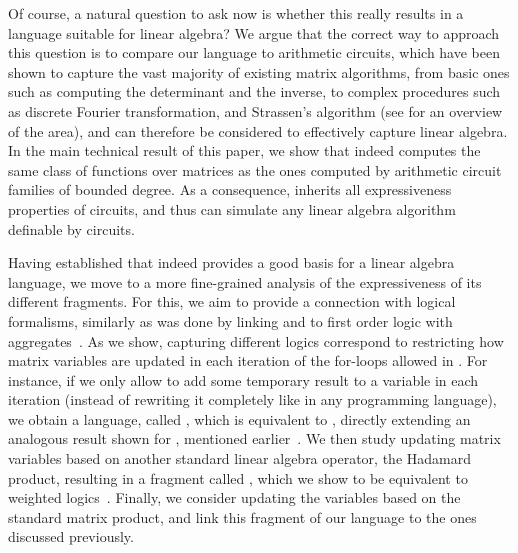 Of course, a natural question to ask now is whether this really results in a language suitable for linear algebra? We argue that the correct way to approach this question is to compare our language to arithmetic circuits, which have been shown to capture the vast majority of existing matrix algorithms, from basic ones such as computing the determinant and the inverse, to complex procedures such as discrete Fourier transformation, and Strassen's algorithm (see \cite{ShpilkaY10,allender} for an overview of the area), and can therefore be considered to effectively capture linear algebra. In the main technical result of this paper, we show that \langfor indeed computes the same class of functions over matrices as the ones computed by arithmetic circuit families of bounded degree.  As a consequence, \langfor inherits all expressiveness properties of circuits, and thus can simulate any linear algebra algorithm definable by circuits.

Having established that \langfor indeed provides a good basis for a linear algebra language, we move to a more fine-grained analysis of the expressiveness of its different fragments. For this, we aim to provide a connection with logical formalisms, similarly as was done by linking \lara and \lang to first order logic with aggregates~\cite{BarceloH0S20,matlang-journal}. As we show, capturing different logics correspond to restricting how matrix variables are updated in each iteration of the for-loops allowed in \langfor. For instance, if we only allow to add some temporary result to a variable in each iteration (instead of rewriting it completely like in any programming language), we obtain a language, called \langsum, which is equivalent to \rak, directly extending an analogous result shown for \lang, mentioned earlier~\cite{brijder2019matrices}. We then study updating matrix variables based on another standard linear algebra operator, the Hadamard product, resulting in a fragment called \langprod, which we show to be equivalent to weighted logics~\cite{DrosteG05}. Finally, we consider updating the variables based on the standard matrix product, and link this fragment of our language to the ones discussed 
previously.  

